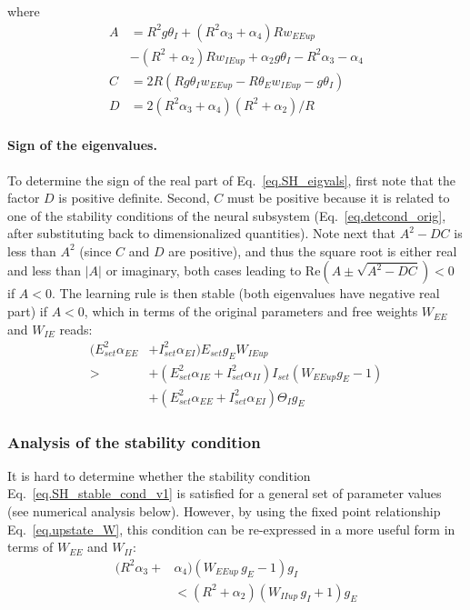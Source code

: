 \documentclass[twocolumn]{article}
\newcommand{\EE}{\mathit{EE}}
\newcommand{\EI}{\mathit{EI}}
\newcommand{\IE}{\mathit{IE}}
\newcommand{\II}{\mathit{II}}
\newcommand{\set}{\mathit{set}}
\newcommand{\up}{\mathit{up}}
\newcommand{\RE}{\mathrm{Re}}
\begin{document}
\noindent where
\begin{equation}
\begin{aligned}
A & = R^2 g \theta_I + (R^2 \alpha_3 + \alpha_4) R w_{\EE\up} \\
& - (R^2 + \alpha_2)R w_{\IE\up} + \alpha_2 g \theta_I - R^2 \alpha_3 - \alpha_4 \\
C & = 2R(R g \theta_I w_{\EE\up} - R \theta_E w_{\IE\up} - g \theta_I) \\
D & = 2(R^2\alpha_3 + \alpha_4)(R^2 + \alpha_2)/R
\end{aligned}
\end{equation}


\paragraph{Sign of the eigenvalues.}

To determine the sign of the real part of Eq.\ \ref{eq.SH_eigvals}, first note that the factor $D$ is positive definite. Second, $C$ must be positive because it is related to one of the stability conditions of the neural subsystem (Eq.\ \ref{eq.detcond_orig}, after substituting back to dimensionalized quantities). Note next that $A^2 - DC$ is less than $A^2$ (since $C$ and $D$ are positive), and thus the square root is either real and less than $|A|$ or imaginary, both cases leading to $\RE(A \pm \sqrt{A^2-DC}) < 0$ if $A<0$. The learning rule is then stable (both eigenvalues have negative real part) if $A<0$, which in terms of the original parameters and free weights $W_{\EE}$ and $W_{\IE}$ reads:
\begin{equation}
\begin{aligned}
(E_{\set}^2 \alpha_{\EE} & + I_{\set}^2 \alpha_{\EI}) E_{\set} g_E W_{\IE\up} \\
> & + (E_{\set}^2 \alpha_{\IE} + I_{\set}^2 \alpha_{\II}) I_{\set}(W_{\EE\up} g_E - 1) \\
& + (E_{\set}^2 \alpha_{\EE} + I_{\set}^2 \alpha_{\EI}) \Theta_I g_E
\end{aligned}
\label{eq.SH_stable_cond_v1}
\end{equation}


\subsubsection{Analysis of the stability condition}

It is hard to determine whether the stability condition Eq.\ \ref{eq.SH_stable_cond_v1} is satisfied for a general set of parameter values (see numerical analysis below). However, by using the fixed point relationship Eq.\ \ref{eq.upstate_W}, this condition can be re-expressed in a more useful form in terms of $W_{\EE}$ and $W_{\II}$:
\begin{equation}
\begin{aligned}
(R^2 \alpha_3 + & \alpha_4)(W_{\EE\up} \, g_E  - 1)g_I \\
& < (R^2 + \alpha_2)(W_{\II\up} \, g_I + 1)g_E
\end{aligned}
\label{eq.SH_stable_cond_v2}
\end{equation}
\end{document}
